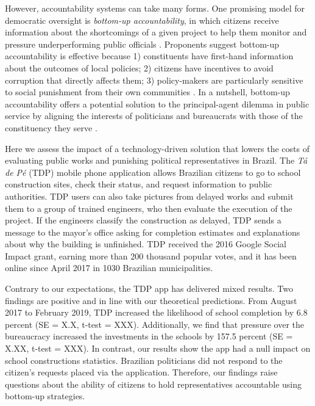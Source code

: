 \documentclass[12pt,a4paper,]{article}
\begin{document}
However, accountability systems can take many forms. One promising model
for democratic oversight is \emph{bottom-up accountability}, in which
citizens receive information about the shortcomings of a given project
to help them monitor and pressure underperforming public officials
\citep{kosack2014does, molina2016community,raffler2018weakness}.
Proponents suggest bottom-up accountability is effective because 1)
constituents have first-hand information about the outcomes of local
policies; 2) citizens have incentives to avoid corruption that directly
affects them; 3) policy-makers are particularly sensitive to social
punishment from their own communities \citep[570]{serra2011combining}.
In a nutshell, bottom-up accountability offers a potential solution to
the principal-agent dilemma in public service by aligning the interests
of politicians and bureaucrats with those of the constituency they serve
\citep[2]{raffler2018weakness}.

Here we assess the impact of a technology-driven solution that lowers
the costs of evaluating public works and punishing political
representatives in Brazil. The \emph{Tá de Pé} (TDP) mobile phone
application allows Brazilian citizens to go to school construction
sites, check their status, and request information to public
authorities. TDP users can also take pictures from delayed works and
submit them to a group of trained engineers, who then evaluate the
execution of the project. If the engineers classify the construction as
delayed, TDP sends a message to the mayor's office asking for completion
estimates and explanations about why the building is unfinished. TDP
received the 2016 Google Social Impact grant, earning more than 200
thousand popular votes, and it has been online since April 2017 in 1030
Brazilian municipalities.

Contrary to our expectations, the TDP app has delivered mixed results.
Two findings are positive and in line with our theoretical predictions.
From August 2017 to February 2019, TDP increased the likelihood of
school completion by 6.8 percent (SE = X.X, t-test = XXX). Additionally,
we find that pressure over the bureaucracy increased the investments in
the schools by 157.5 percent (SE = X.XX, t-test = XXX). In contrast, our
results show the app had a null impact on school constructions
statistics. Brazilian politicians did not respond to the citizen's
requests placed via the application. Therefore, our findings raise
questions about the ability of citizens to hold representatives
accountable using bottom-up strategies.
\end{document}
